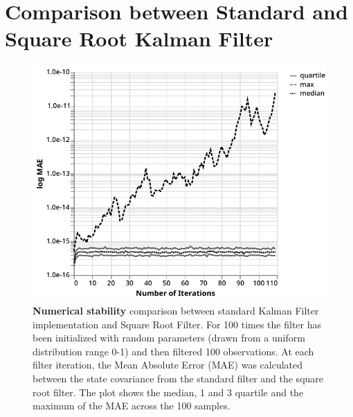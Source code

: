 \documentclass{article}
\let\Oldsection\section
\renewcommand{\section}{\FloatBarrier\Oldsection}
\begin{document}
\section{Comparison between Standard and Square Root Kalman Filter}

\setcounter{figure}{0} 

\begin{figure}
\includegraphics[width=\textwidth]{numerical_stability}
 \caption{\textbf{Numerical stability} comparison between standard Kalman Filter implementation and Square Root Filter. For 100 times the filter has been initialized with random parameters (drawn from a uniform distribution range 0-1) and then filtered 100 observations. At each filter iteration, the Mean Absolute Error (MAE) was calculated between the state covariance from the standard filter and the square root filter. The plot shows the median, 1 and 3 quartile and the maximum of the MAE across the 100 samples.}
 \label{fig:num_stab}
\end{figure}
\end{document}
